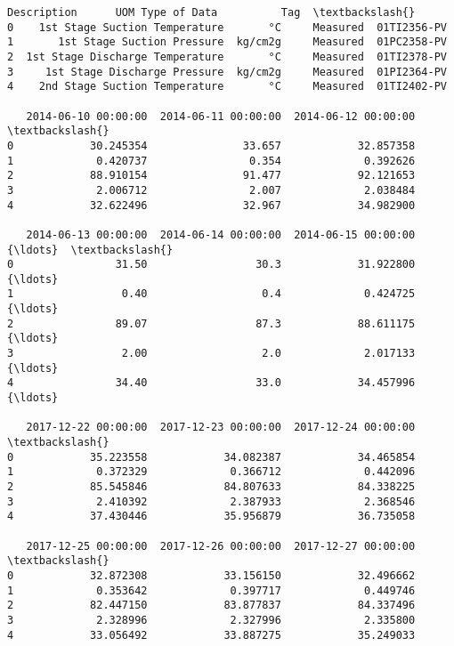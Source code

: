 \documentclass[11pt]{article}
\makeatletter
\newcommand{\boxspacing}{\kern\kvtcb@left@rule\kern\kvtcb@boxsep}
\newcommand{\prompt}[4]{
        \ttfamily\llap{{\color{#2}[#3]:\hspace{3pt}#4}}\vspace{-\baselineskip}
    }
\makeatother
\begin{document}
            \begin{tcolorbox}[breakable, size=fbox, boxrule=.5pt, pad at break*=1mm, opacityfill=0]
\prompt{Out}{outcolor}{3}{\boxspacing}
\begin{Verbatim}[commandchars=\\\{\}]
                       Description      UOM Type of Data          Tag  \textbackslash{}
0    1st Stage Suction Temperature       °C     Measured  01TI2356-PV
1       1st Stage Suction Pressure  kg/cm2g     Measured  01PC2358-PV
2  1st Stage Discharge Temperature       °C     Measured  01TI2378-PV
3     1st Stage Discharge Pressure  kg/cm2g     Measured  01PI2364-PV
4    2nd Stage Suction Temperature       °C     Measured  01TI2402-PV

   2014-06-10 00:00:00  2014-06-11 00:00:00  2014-06-12 00:00:00  \textbackslash{}
0            30.245354               33.657            32.857358
1             0.420737                0.354             0.392626
2            88.910154               91.477            92.121653
3             2.006712                2.007             2.038484
4            32.622496               32.967            34.982900

   2014-06-13 00:00:00  2014-06-14 00:00:00  2014-06-15 00:00:00  {\ldots}  \textbackslash{}
0                31.50                 30.3            31.922800  {\ldots}
1                 0.40                  0.4             0.424725  {\ldots}
2                89.07                 87.3            88.611175  {\ldots}
3                 2.00                  2.0             2.017133  {\ldots}
4                34.40                 33.0            34.457996  {\ldots}

   2017-12-22 00:00:00  2017-12-23 00:00:00  2017-12-24 00:00:00  \textbackslash{}
0            35.223558            34.082387            34.465854
1             0.372329             0.366712             0.442096
2            85.545846            84.807633            84.338225
3             2.410392             2.387933             2.368546
4            37.430446            35.956879            36.735058

   2017-12-25 00:00:00  2017-12-26 00:00:00  2017-12-27 00:00:00  \textbackslash{}
0            32.872308            33.156150            32.496662
1             0.353642             0.397717             0.449746
2            82.447150            83.877837            84.337496
3             2.328996             2.327996             2.335800
4            33.056492            33.887275            35.249033


\end{Verbatim}
\end{tcolorbox}
\end{document}
